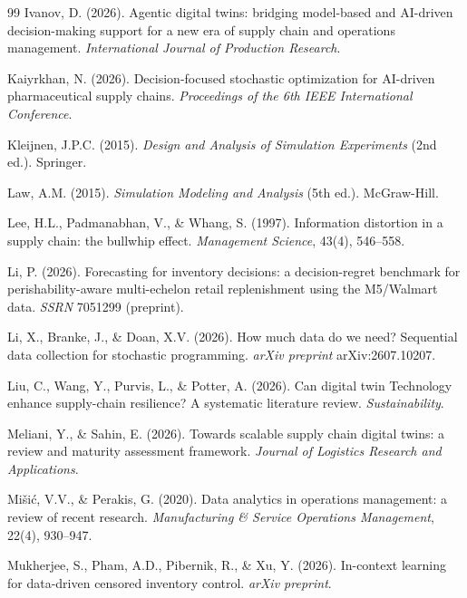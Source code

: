 \documentclass[12pt,a4paper]{article}
\begin{document}
\begin{thebibliography}{99}
 Ivanov, D. (2026). Agentic digital twins: bridging model-based and AI-driven decision-making support for a new era of supply chain and operations management. \textit{International Journal of Production Research}.

 Kaiyrkhan, N. (2026). Decision-focused stochastic optimization for AI-driven pharmaceutical supply chains. \textit{Proceedings of the 6th IEEE International Conference}.

 Kleijnen, J.P.C. (2015). \textit{Design and Analysis of Simulation Experiments} (2nd ed.). Springer.

 Law, A.M. (2015). \textit{Simulation Modeling and Analysis} (5th ed.). McGraw-Hill.

 Lee, H.L., Padmanabhan, V., \& Whang, S. (1997). Information distortion in a supply chain: the bullwhip effect. \textit{Management Science}, 43(4), 546--558.

 Li, P. (2026). Forecasting for inventory decisions: a decision-regret benchmark for perishability-aware multi-echelon retail replenishment using the M5/Walmart data. \textit{SSRN} 7051299 (preprint).

 Li, X., Branke, J., \& Doan, X.V. (2026). How much data do we need? Sequential data collection for stochastic programming. \textit{arXiv preprint} arXiv:2607.10207.

 Liu, C., Wang, Y., Purvis, L., \& Potter, A. (2026). Can digital twin Technology enhance supply-chain resilience? A systematic literature review. \textit{Sustainability}.

 Meliani, Y., \& Sahin, E. (2026). Towards scalable supply chain digital twins: a review and maturity assessment framework. \textit{Journal of Logistics Research and Applications}.

 Mi\v{s}i\'{c}, V.V., \& Perakis, G. (2020). Data analytics in operations management: a review of recent research. \textit{Manufacturing \& Service Operations Management}, 22(4), 930--947.

 Mukherjee, S., Pham, A.D., Pibernik, R., \& Xu, Y. (2026). In-context learning for data-driven censored inventory control. \textit{arXiv preprint}.


\end{thebibliography}
\end{document}
